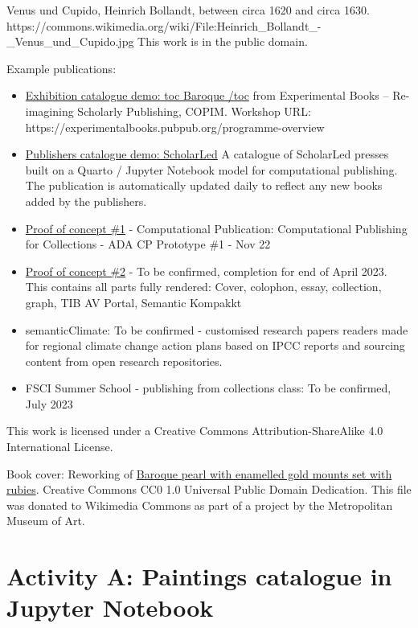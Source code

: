\documentclass[
  letterpaper,
]{book}
\begin{document}
Venus und Cupido, Heinrich Bollandt, between circa 1620 and circa 1630.
https://commons.wikimedia.org/wiki/File:Heinrich\_Bollandt\_-\_Venus\_und\_Cupido.jpg
This work is in the public domain.

Example publications:

\begin{itemize}
\item
  \href{https://nfdi4culture.github.io/experimental-books-workshop/}{Exhibition
  catalogue demo: toc Baroque /toc} from Experimental Books --
  Re-imagining Scholarly Publishing, COPIM. Workshop URL:
  https://experimentalbooks.pubpub.org/programme-overview
\item
  \href{https://nfdi4culture.github.io/experimental-books-workshop/}{Publishers
  catalogue demo: ScholarLed} A catalogue of ScholarLed presses built on
  a Quarto / Jupyter Notebook model for computational publishing. The
  publication is automatically updated daily to reflect any new books
  added by the publishers.
\item
  \href{https://nfdi4culture.github.io/cp4c/}{Proof of concept \#1} -
  Computational Publication: Computational Publishing for Collections -
  ADA CP Prototype \#1 - Nov 22
\item
  \href{https://nfdi4culture.github.io/art_catalogue_test/}{Proof of
  concept \#2} - To be confirmed, completion for end of April 2023. This
  contains all parts fully rendered: Cover, colophon, essay, collection,
  graph, TIB AV Portal, Semantic Kompakkt
\item
  semanticClimate: To be confirmed - customised research papers readers
  made for regional climate change action plans based on IPCC reports
  and sourcing content from open research repositories.
\item
  FSCI Summer School - publishing from collections class: To be
  confirmed, July 2023
\end{itemize}

This work is licensed under a Creative Commons Attribution-ShareAlike
4.0 International License.

Book cover: Reworking of
\href{https://en.wikipedia.org/wiki/File:Pendant_in_the_form_of_a_siren_MET_DT7173.jpg}{Baroque
pearl with enamelled gold mounts set with rubies}. Creative Commons CC0
1.0 Universal Public Domain Dedication. This file was donated to
Wikimedia Commons as part of a project by the Metropolitan Museum of
Art.


\hypertarget{activity-a-paintings-catalogue-in-jupyter-notebook}{%
\chapter{Activity A: Paintings catalogue in Jupyter
Notebook}\label{activity-a-paintings-catalogue-in-jupyter-notebook}}
\end{document}
